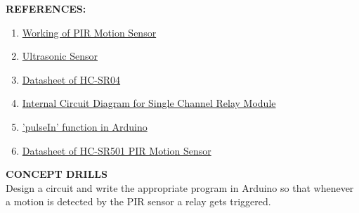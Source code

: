 \documentclass[12pt,a4paper]{article}
\begin{document}
\setlength{\parindent}{0eM}
\begin{justify}

\noindent \textbf{\large REFERENCES:}
\vspace{-3mm}
\begin{enumerate}
 \setlength\itemsep{-0.3em}
\item \href{https://learn.adafruit.com/pir-passive-infrared-proximity-motion-sensor/how-pirs-work}{Working of PIR Motion Sensor}
\item \href{https://medium.com/@aquibansari12377/ultrasonic-sensor-and-arduino-tutorial-89c38c81f103}{Ultrasonic Sensor}
\item \href{https://datasheetspdf.com/pdf-file/1380138/ETC1/HC-SR04/1}{Datasheet of  HC-SR04}
\item \href{https://components101.com/switches/5v-single-channel-relay-module-pinout-features-applications-working-datasheet}{Internal Circuit Diagram for Single Channel Relay Module}
\item \href{https://www.arduino.cc/en/Reference.PulseIn}{'pulseIn' function in Arduino}
\item \href{https://cdn-learn.adafruit.com/downloads/pdf/pir-passive-infrared-proximity-motion-sensor.pdf}{Datasheet of HC-SR501 PIR Motion Sensor}
\end{enumerate}

\noindent \textbf{\large CONCEPT DRILLS}\\[3pt]
Design a circuit and write the appropriate program in Arduino so that whenever a motion is detected by the PIR sensor a relay gets triggered.

\end{justify}
\end{document}
